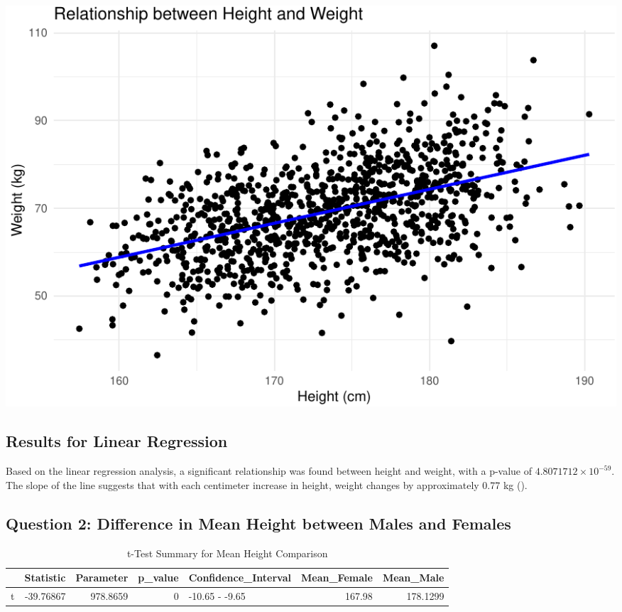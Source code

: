 \documentclass[
]{article}
\begin{document}
\begin{center}\includegraphics{PART-1_files/figure-latex/linear-model-1} \end{center}

\subsection{Results for Linear
Regression}\label{results-for-linear-regression}

Based on the linear regression analysis, a significant relationship was
found between height and weight, with a p-value of
\ensuremath{4.8071712\times 10^{-59}}. The slope of the line suggests
that with each centimeter increase in height, weight changes by
approximately 0.77 kg ().

\subsection{Question 2: Difference in Mean Height between Males and
Females}\label{question-2-difference-in-mean-height-between-males-and-females}

\begin{longtable}[t]{lrrrlrr}
\caption{\label{tab:unnamed-chunk-3}t-Test Summary for Mean Height Comparison}\\
\toprule
 & Statistic & Parameter & p\_value & Confidence\_Interval & Mean\_Female & Mean\_Male\\
\midrule
t & -39.76867 & 978.8659 & 0 & -10.65 - -9.65 & 167.98 & 178.1299\\
\bottomrule
\end{longtable}
\end{document}
